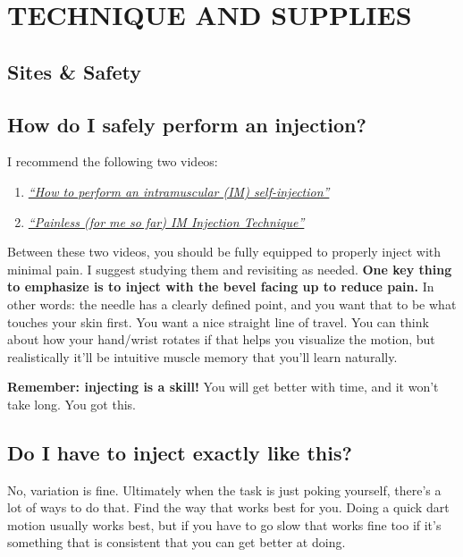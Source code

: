 \documentclass{article}
\begin{document}
\section{TECHNIQUE AND SUPPLIES}\label{ts}

\subsection*{Sites \& Safety}

\subsection{How do I safely perform an injection?}

I recommend the following two videos:

\begin{enumerate}
  \item \href{https://www.youtube.com/watch?v=cBabaGC2Dok}{\textit{“How to perform an intramuscular (IM) self-injection”}}
  \item \href{https://www.youtube.com/watch?v=YfNlAZLxLyw}{\textit{“Painless (for me so far) IM Injection Technique”}}
\end{enumerate}

Between these two videos, you should be fully equipped to properly inject with minimal pain. I suggest studying them and revisiting as needed. \textbf{One key thing to emphasize is to inject with the bevel facing up to reduce pain.} In other words: the needle has a clearly defined point, and you want that to be what touches your skin first. You want a nice straight line of travel. You can think about how your hand/wrist rotates if that helps you visualize the motion, but realistically it'll be intuitive muscle memory that you'll learn naturally.

\textbf{Remember: injecting is a skill!} You will get better with time, and it won’t take long. You got this.

\subsection{Do I have to inject exactly like this?}

No, variation is fine. Ultimately when the task is just poking yourself, there’s a lot of ways to do that. Find the way that works best for you. Doing a quick dart motion usually works best, but if you have to go slow that works fine too if it’s something that is consistent that you can get better at doing.
\end{document}
